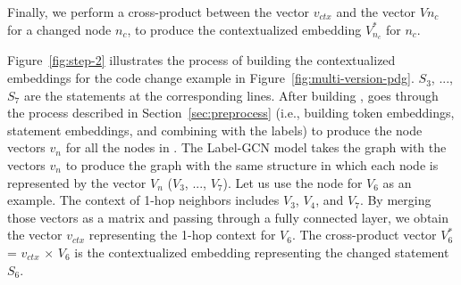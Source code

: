 Finally, we perform a cross-product between the vector $v_{ctx}$ and
the vector $V{n_c}$ for a changed node $n_c$, to produce the
contextualized embedding $V^{*}_{n_c}$ for $n_c$.


Figure~\ref{fig:step-2} illustrates the process of building the
contextualized embeddings for the code change example in
Figure~\ref{fig:multi-version-pdg}. $S_3$, ..., $S_7$ are the
statements at the corresponding lines. After building {\mvpdg},
{\tool} goes through the process described in
Section~\ref{sec:preprocess} (i.e., building token embeddings,
statement embeddings, and combining with the labels) to produce the
node vectors $v_n$ for all the nodes in {\mvpdg}. The Label-GCN model
takes the graph with the vectors $v_n$ to produce the graph with the
same structure in which each node is represented by the vector $V_n$
($V_3$, ..., $V_7$). Let us use the node for $V_6$ as an example.  The
context of 1-hop neighbors includes $V_3$, $V_4$, and $V_7$. By
merging those vectors as a matrix and passing through a fully
connected layer, we obtain the vector $v_{ctx}$ representing the 1-hop
context for $V_6$. The cross-product vector  $V^{*}_6$ = $v_{ctx}$ $\times$ $V_6$
is the contextualized embedding representing the changed statement
$S_6$.




